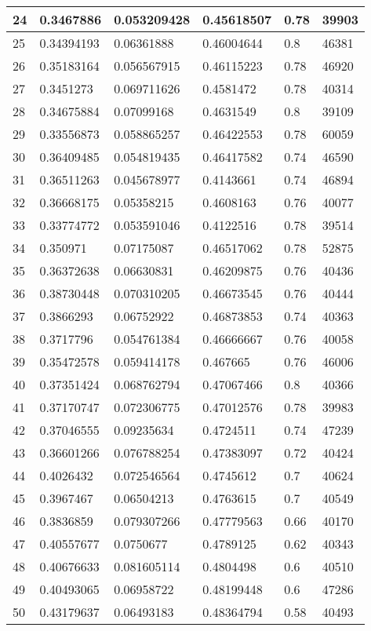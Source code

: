 \begin{longtable}{|l|l|l|l|l|l|}
24 & 0.3467886 & 0.053209428 & 0.45618507 & 0.78 & 39903 \\ \hline 
25 & 0.34394193 & 0.06361888 & 0.46004644 & 0.8 & 46381 \\ \hline 
26 & 0.35183164 & 0.056567915 & 0.46115223 & 0.78 & 46920 \\ \hline 
27 & 0.3451273 & 0.069711626 & 0.4581472 & 0.78 & 40314 \\ \hline 
28 & 0.34675884 & 0.07099168 & 0.4631549 & 0.8 & 39109 \\ \hline 
29 & 0.33556873 & 0.058865257 & 0.46422553 & 0.78 & 60059 \\ \hline 
30 & 0.36409485 & 0.054819435 & 0.46417582 & 0.74 & 46590 \\ \hline 
31 & 0.36511263 & 0.045678977 & 0.4143661 & 0.74 & 46894 \\ \hline 
32 & 0.36668175 & 0.05358215 & 0.4608163 & 0.76 & 40077 \\ \hline 
33 & 0.33774772 & 0.053591046 & 0.4122516 & 0.78 & 39514 \\ \hline 
34 & 0.350971 & 0.07175087 & 0.46517062 & 0.78 & 52875 \\ \hline 
35 & 0.36372638 & 0.06630831 & 0.46209875 & 0.76 & 40436 \\ \hline 
36 & 0.38730448 & 0.070310205 & 0.46673545 & 0.76 & 40444 \\ \hline 
37 & 0.3866293 & 0.06752922 & 0.46873853 & 0.74 & 40363 \\ \hline 
38 & 0.3717796 & 0.054761384 & 0.46666667 & 0.76 & 40058 \\ \hline 
39 & 0.35472578 & 0.059414178 & 0.467665 & 0.76 & 46006 \\ \hline 
40 & 0.37351424 & 0.068762794 & 0.47067466 & 0.8 & 40366 \\ \hline 
41 & 0.37170747 & 0.072306775 & 0.47012576 & 0.78 & 39983 \\ \hline 
42 & 0.37046555 & 0.09235634 & 0.4724511 & 0.74 & 47239 \\ \hline 
43 & 0.36601266 & 0.076788254 & 0.47383097 & 0.72 & 40424 \\ \hline 
44 & 0.4026432 & 0.072546564 & 0.4745612 & 0.7 & 40624 \\ \hline 
45 & 0.3967467 & 0.06504213 & 0.4763615 & 0.7 & 40549 \\ \hline 
46 & 0.3836859 & 0.079307266 & 0.47779563 & 0.66 & 40170 \\ \hline 
47 & 0.40557677 & 0.0750677 & 0.4789125 & 0.62 & 40343 \\ \hline 
48 & 0.40676633 & 0.081605114 & 0.4804498 & 0.6 & 40510 \\ \hline 
49 & 0.40493065 & 0.06958722 & 0.48199448 & 0.6 & 47286 \\ \hline 
50 & 0.43179637 & 0.06493183 & 0.48364794 & 0.58 & 40493 \\ \hline 
\end{longtable}